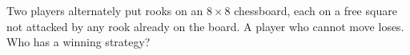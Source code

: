 Two players alternately put rooks on an $8\times8$ chessboard, each on a free square not attacked by any rook already on the board. A player who cannot move loses. Who has a winning strategy?
